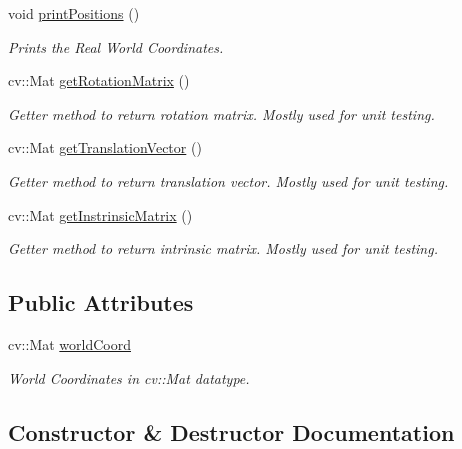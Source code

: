 \begin{DoxyCompactItemize}
void \hyperlink{classLocator_ae702d1254f48d0b37d0e98612fde768d}{print\+Positions} ()
\begin{DoxyCompactList}\small\item\em Prints the Real World Coordinates. \end{DoxyCompactList}\item 
cv\+::\+Mat \hyperlink{classLocator_a0ddf0eb54e7af896ac04654602d2459d}{get\+Rotation\+Matrix} ()
\begin{DoxyCompactList}\small\item\em Getter method to return rotation matrix. Mostly used for unit testing. \end{DoxyCompactList}\item 
cv\+::\+Mat \hyperlink{classLocator_a9a34468f1f815a132ab3dbf62b883fb7}{get\+Translation\+Vector} ()
\begin{DoxyCompactList}\small\item\em Getter method to return translation vector. Mostly used for unit testing. \end{DoxyCompactList}\item 
cv\+::\+Mat \hyperlink{classLocator_a551e2fe1ea1d84838651d2a4716707b5}{get\+Instrinsic\+Matrix} ()
\begin{DoxyCompactList}\small\item\em Getter method to return intrinsic matrix. Mostly used for unit testing. \end{DoxyCompactList}\end{DoxyCompactItemize}
\subsection*{Public Attributes}
\begin{DoxyCompactItemize}
\item 
cv\+::\+Mat \hyperlink{classLocator_ac9f5a8f6aa5dd57776947961ca49098a}{world\+Coord}\hypertarget{classLocator_ac9f5a8f6aa5dd57776947961ca49098a}{}\label{classLocator_ac9f5a8f6aa5dd57776947961ca49098a}

\begin{DoxyCompactList}\small\item\em World Coordinates in cv\+::\+Mat datatype. \end{DoxyCompactList}\end{DoxyCompactItemize}


\subsection{Constructor \& Destructor Documentation}
